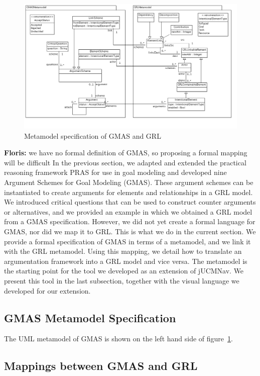 \documentclass[11.5pt,two column]{llncs}
\newcommand{\floris}[1]{{\color{red}\textbf{Floris: }#1}}
\begin{document}
\begin{figure}[h]
\includegraphics[scale=0.45]{img/ClassDiagram}
\caption{Metamodel specification of GMAS and GRL}
\label{fig:metamodel}
\end{figure}
\floris{we have no formal definition of GMAS, so proposing a formal mapping will be difficult}
In the previous section, we adapted and extended the practical reasoning framework PRAS for use in goal modeling and developed  nine Argument Schemes for Goal Modeling (GMAS). These argument schemes can be instantiated to create arguments for elements and relationships in a GRL model. We introduced critical questions that can be used to construct counter arguments or alternatives, and we provided an example in which we obtained a GRL model from a GMAS specification. However, we did not yet create a formal language for GMAS, nor did we map it to GRL. This is what we do in the current section. We provide a formal specification of GMAS in terms of a metamodel, and we link it with the GRL metamodel. Using this mapping, we detail how to translate an argumentation framework into a GRL model and vice versa. The metamodel is the starting point for the tool we developed as an extension of jUCMNav. We present this tool in the last subsection, together with the visual language we developed for our extension.

\subsection{GMAS Metamodel Specification}
\label{sect:implementation:metamodel}

The UML metamodel of GMAS is shown on the left hand side of figure~\ref{fig:metamodel}.


\subsection{Mappings between GMAS and GRL}
\label{sect:implementation:mappings}
\end{document}
